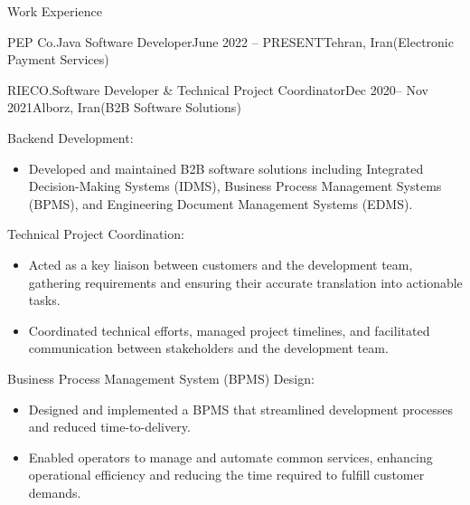 \documentclass[]{kyvernitis-resume}
\begin{document}
\begin{section}{Work Experience}
\begin{subsection}{PEP Co.}{Java Software Developer}{June 2022 -- PRESENT}{Tehran, Iran}{(Electronic Payment Services)}
    \end{subsection}

\hfill

 \begin{subsection}{RIECO.}{Software Developer  \& Technical Project Coordinator}{Dec 2020-- Nov 2021}{Alborz, Iran}{(B2B Software Solutions)}
	\item Backend Development:
		\begin{itemize}
			\item Developed and maintained B2B software solutions including Integrated Decision-Making Systems (IDMS), Business Process Management Systems (BPMS), and Engineering Document Management Systems (EDMS).
		\end{itemize}

	\item Technical Project Coordination:
		\begin{itemize}
			\item Acted as a key liaison between customers and the development team, gathering requirements and ensuring their accurate translation into actionable tasks.
			\item Coordinated technical efforts, managed project timelines, and facilitated communication between stakeholders and the development team.
		\end{itemize}

	\item Business Process Management System (BPMS) Design:
		\begin{itemize}
			\item Designed and implemented a BPMS that streamlined development processes and reduced time-to-delivery.
			\item Enabled operators to manage and automate common services, enhancing operational efficiency and reducing the time required to fulfill customer demands.
		\end{itemize}
	

\end{subsection}
\end{section}
\end{document}

